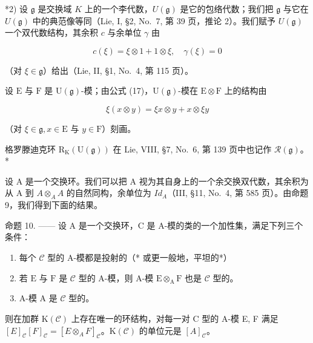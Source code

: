 *2) 设 \(\mathfrak{g}\) 是交换域 \(K\) 上的一个李代数，\(U(\mathfrak{g})\) 是它的包络代数；我们把 \(\mathfrak{g}\) 与它在 \(U(\mathfrak{g})\) 中的典范像等同（Lie, I, §2, No.~7, 第 39 页，推论 2）。我们赋予 \(U(\mathfrak{g})\) 一个双代数结构，其余积 \(c\) 与余单位 \(\gamma\) 由

\[
c (\xi) = \xi \otimes 1 + 1 \otimes \xi , \quad \gamma (\xi) = 0\tag{17}
\]

（对 \(\xi\in\mathfrak{g}\)）给出（Lie, II, §1, No.~4, 第 115 页）。

设 \(\mathrm{E}\) 与 \(\mathrm{F}\) 是 \(\mathrm{U}(\mathfrak{g})\)-模；由公式 (17)，\(\mathrm{U}(\mathfrak{g})\)-模在 \(\mathrm{E} \otimes \mathrm{F}\) 上的结构由

\[
\xi (x \otimes y) = \xi x \otimes y + x \otimes \xi y\tag{18}
\]

（对 \(\xi\in\mathfrak{g}, x\in\mathrm{E}\) 与 \(y\in\mathrm{F}\)）刻画。

格罗滕迪克环 \(\mathrm{R}_{\mathrm{K}}(\mathrm{U}(\mathfrak{g}))\) 在 Lie, VIII, §7, No.~6, 第 139 页中也记作 \(\mathcal{R}(\mathfrak{g})\)。*

设 A 是一个交换环。我们可以把 A 视为其自身上的一个余交换双代数，其余积为从 A 到 \(A \otimes_{A} A\) 的自然同构，余单位为 \(Id_{A}\)（III, §11, No.~4, 第 585 页）。由命题 9，我们得到下面的结果。

命题 10. —— 设 A 是一个交换环，C 是 A-模的类的一个加性集，满足下列三个条件：

\begin{enumerate}
\def\labelenumi{(\roman{enumi})}
\item
  每个 \(\mathcal{C}\) 型的 A-模都是投射的（* 或更一般地，平坦的*）
\item
  若 \(\mathrm{E}\) 与 \(\mathrm{F}\) 是 \(\mathcal{C}\) 型的 A-模，则 A-模 \(\mathrm{E} \otimes_{\mathrm{A}} \mathrm{F}\) 也是 \(\mathcal{C}\) 型的。
\item
  A-模 A 是 \(\mathcal{C}\) 型的。
\end{enumerate}

则在加群 \(\mathrm{K}(\mathcal{C})\) 上存在唯一的环结构，对每一对 C 型的 A-模 E, F 满足 \([E]_{\mathcal{C}}[F]_{\mathcal{C}} = [E \otimes_{A} F]_{\mathcal{C}}\)。\(\mathrm{K}(\mathcal{C})\) 的单位元是 \([A]_{\mathcal{C}}\)。

